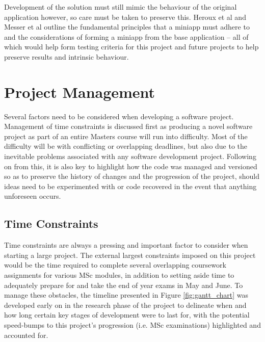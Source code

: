 \documentclass[conference]{IEEEtran}
\begin{document}
Development of the solution must still mimic the behaviour of the original application however, so care must be taken to preserve this. Heroux et al\cite{miniapps} and Messer et al\cite{messer2015developing} outline the fundamental principles that a miniapp must adhere to and the considerations of forming a miniapp from the base application – all of which would help form testing criteria for this project and future projects to help preserve results and intrinsic behaviour.


\section{Project Management}
\label{sec:projectmgmt}

Several factors need to be considered when developing a software project. Management of time constraints is discussed first as producing a novel software project as part of an entire Masters course will run into difficulty. Most of the difficulty will be with conflicting or overlapping deadlines, but also due to the inevitable problems associated with any software development project. Following on from this, it is also key to highlight how the code was managed and versioned so as to preserve the history of changes and the progression of the project, should ideas need to be experimented with or code recovered in the event that anything unforeseen occurs.

\subsection{Time Constraints}

Time constraints are always a pressing and important factor to consider when starting a large project. The external largest constraints imposed on this project would be the time required to complete several overlapping coursework assignments for various MSc modules, in addition to setting aside time to adequately prepare for and take the end of year exams in May and June. To manage these obstacles, the timeline presented in Figure \ref{fig:gantt_chart} was developed early on in the research phase of the project to delineate when and how long certain key stages of development were to last for, with the potential speed-bumps to this project's progression (i.e. MSc examinations) highlighted and accounted for.
\end{document}
